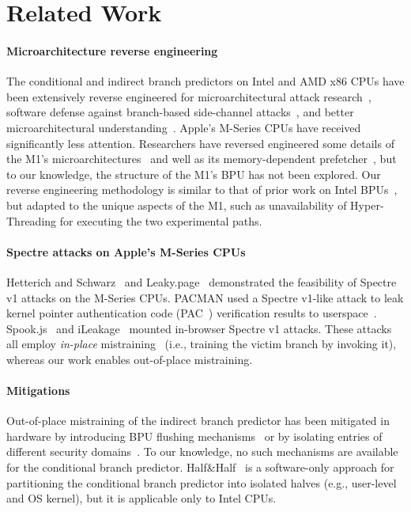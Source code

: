 \section{Related Work}
\paragraph{Microarchitecture reverse engineering}
The conditional and indirect branch predictors on Intel and AMD x86 CPUs have been extensively reverse engineered for microarchitectural attack research~\cite{HornSpectre,Kocher2018spectre,JumpOverAslr,SetAndForget,ExploreBranchPredictor,Indirector}, software defense against branch-based side-channel attacks~\cite{HalfAndHalf}, and better microarchitectural understanding~\cite{Demystifying,VladimirPaper,VladimirThesis}.
Apple's M-Series CPUs have received significantly less attention.
Researchers have reversed engineered some details of the M1's microarchitectures~\cite{M1Explore,DougallM1} and well as its memory-dependent prefetcher~\cite{Augury,gofetch}, but to our knowledge, the structure of the M1's BPU has not been explored.
Our reverse engineering methodology is similar to that of prior work on Intel BPUs~\cite{HornSpectre,VladimirPaper,HalfAndHalf,Indirector}, but adapted to the unique aspects of the M1, such as unavailability of Hyper-Threading for executing the two experimental paths.



\paragraph{Spectre attacks on Apple's M-Series CPUs}
Hetterich and Schwarz~\cite{BranchDifferent} and Leaky.page~\cite{leakyPage} demonstrated the feasibility of Spectre v1 attacks
on the M-Series CPUs.
PACMAN used a Spectre v1-like attack to leak kernel pointer authentication code (PAC~\cite{PAC}) verification results to userspace~\cite{Pacman}.
Spook.js~\cite{spookjs} and iLeakage~\cite{iLeakage} mounted in-browser Spectre v1 attacks.
These attacks all employ \emph{in-place} mistraining~\cite{canella2019systematic} (i.e., training the victim branch by invoking it), whereas our work enables out-of-place mistraining.

\paragraph{Mitigations}
Out-of-place mistraining of the indirect branch predictor has been mitigated in hardware by introducing BPU flushing mechanisms~\cite{ibrs,csv2} or by isolating entries of different security domains~\cite{AppleSecurityPatent,ExynosBPU}.
To our knowledge, no such mechanisms are available for the conditional branch predictor.
Half\&Half~\cite{HalfAndHalf} is a software-only approach for partitioning the conditional branch predictor into isolated halves (e.g., user-level and OS kernel), but it is applicable only to Intel CPUs.